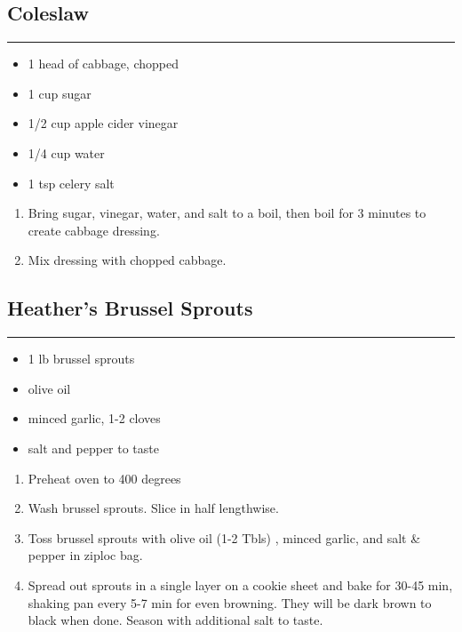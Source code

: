 \documentclass{article}
\begin{document}
\subsection{Coleslaw} 
\noindent\rule[0.5ex]{\linewidth}{1pt}

\begin{framed}
    \begin{itemize}
        \item 1 head of cabbage, chopped
        \item 1 cup sugar
        \item 1/2 cup apple cider vinegar
        \item 1/4 cup water
        \item 1 tsp celery salt
    \end{itemize}
\end{framed}

\begin{enumerate}
    \item 
        Bring sugar, vinegar, water, and salt to a boil, then boil for 3 minutes to create cabbage dressing.
    \item 
        Mix dressing with chopped cabbage.
\end{enumerate}
\newpage

\subsection{Heather's Brussel Sprouts} 
\noindent\rule[0.5ex]{\linewidth}{1pt}

\begin{framed}
    \begin{itemize}
        \item 1 lb brussel sprouts
        \item olive oil
        \item minced garlic, 1-2 cloves
        \item salt and pepper to taste
    \end{itemize}
\end{framed}

\begin{enumerate}
    \item
        Preheat oven to 400 degrees
    \item
        Wash brussel sprouts.  Slice in half lengthwise.
    \item
        Toss brussel sprouts with olive oil (1-2 Tbls) , minced garlic, and salt \& pepper in ziploc bag.
    \item
        Spread out sprouts in a single layer on a cookie sheet and bake for 30-45 min,  shaking pan every 5-7 min for even browning.  They will be dark brown to black when done.  Season with additional salt to taste.
\end{enumerate}
\newpage
\end{document}

